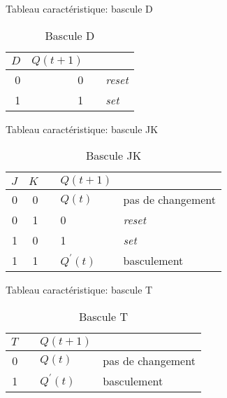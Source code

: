 \documentclass[presentation]{beamer}
\begin{document}
\begin{frame}[label={sec:org7b80031}]{Tableau caractéristique: bascule D}
\begin{table}[htbp]
\caption{\label{tab:org5cb0893}Bascule D}
\centering
\begin{tabular}{rrll}
\(D\) & \(Q(t+1)\) &  & \\[0pt]
\hline
0 & 0 &  & \emph{reset}\\[0pt]
1 & 1 &  & \emph{set}\\[0pt]
\end{tabular}
\end{table}
\end{frame}

\begin{frame}[label={sec:org5a42175}]{Tableau caractéristique: bascule JK}
\begin{table}[htbp]
\caption{\label{tab:org92a3d05}Bascule JK}
\centering
\begin{tabular}{rrlll}
\(J\) & \(K\) &  & \(Q(t+1)\) & \\[0pt]
\hline
0 & 0 &  & \(Q(t)\) & pas de changement\\[0pt]
0 & 1 &  & 0 & \emph{reset}\\[0pt]
1 & 0 &  & 1 & \emph{set}\\[0pt]
1 & 1 &  & \(Q^\prime(t)\) & basculement\\[0pt]
\end{tabular}
\end{table}
\end{frame}

\begin{frame}[label={sec:org2d523bc}]{Tableau caractéristique: bascule T}
\begin{table}[htbp]
\caption{\label{tab:org1800287}Bascule T}
\centering
\begin{tabular}{rlll}
\(T\) &  & \(Q(t+1)\) & \\[0pt]
\hline
0 &  & \(Q(t)\) & pas de changement\\[0pt]
1 &  & \(Q^\prime(t)\) & basculement\\[0pt]
\end{tabular}
\end{table}
\end{frame}
\end{document}
